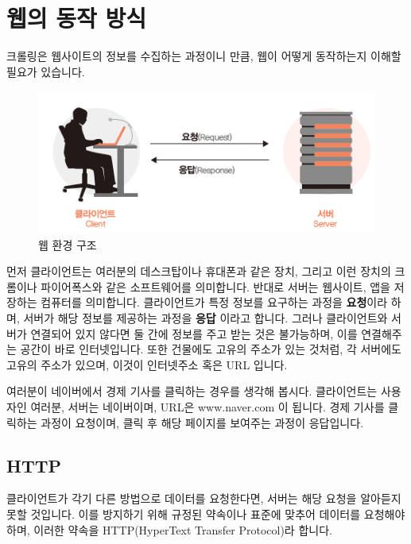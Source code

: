 \documentclass[12pt,]{book}
\begin{document}
\hypertarget{section-6}{%
\section{웹의 동작 방식}\label{section-6}}

크롤링은 웹사이트의 정보를 수집하는 과정이니 만큼, 웹이 어떻게 동작하는지 이해할 필요가 있습니다.

\begin{figure}[h]

{\centering \includegraphics[width=0.7\linewidth]{images/web_str} 

}

\caption{웹 환경 구조}\label{fig:unnamed-chunk-4}
\end{figure}

먼저 클라이언트는 여러분의 데스크탑이나 휴대폰과 같은 장치, 그리고 이런 장치의 크롬이나 파이어폭스와 같은 소프트웨어를 의미합니다. 반대로 서버는 웹사이트, 앱을 저장하는 컴퓨터를 의미합니다. 클라이언트가 특정 정보를 요구하는 과정을 \textbf{요청}이라 하며, 서버가 해당 정보를 제공하는 과정을 \textbf{응답} 이라고 합니다. 그러나 클라이언트와 서버가 연결되어 있지 않다면 둘 간에 정보를 주고 받는 것은 불가능하며, 이를 연결해주는 공간이 바로 인터넷입니다. 또한 건물에도 고유의 주소가 있는 것처럼, 각 서버에도 고유의 주소가 있으며, 이것이 인터넷주소 혹은 URL 입니다.

여러분이 네이버에서 경제 기사를 클릭하는 경우를 생각해 봅시다. 클라이언트는 사용자인 여러분, 서버는 네이버이며, URL은 www.naver.com 이 됩니다. 경제 기사를 클릭하는 과정이 요청이며, 클릭 후 해당 페이지를 보여주는 과정이 응답입니다.

\hypertarget{http}{%
\subsection{HTTP}\label{http}}

클라이언트가 각기 다른 방법으로 데이터를 요청한다면, 서버는 해당 요청을 알아듣지 못할 것입니다. 이를 방지하기 위해 규정된 약속이나 표준에 맞추어 데이터를 요청해야하며, 이러한 약속을 HTTP(HyperText Transfer Protocol)라 합니다.
\end{document}
